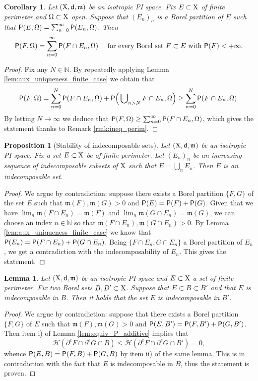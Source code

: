 \documentclass[reqno]{amsart}
\numberwithin{equation}{section}
\newcommand{\N}{\mathbb{N}}
\newcommand{\X}{{\rm X}}
\newcommand{\sfd}{{\sf d}}
\newcommand{\mm}{\mathfrak m}
\newcommand{\1}{\mathbbm 1}
\renewcommand{\P}{{\sf P}}
\renewcommand{\H}{{\mathcal H}}
\newtheorem{corollary}[theorem]{Corollary}
\newtheorem{lemma}[theorem]{Lemma}
\newtheorem{proposition}[theorem]{Proposition}
\begin{document}
%
%
\begin{corollary}\label{cor:aux_uniqueness}
Let \((\X,\sfd,\mm)\) be an isotropic PI space. Fix \(E\subset\X\)
of finite perimeter and \(\Omega\subset\X\) open. Suppose
that \((E_n)_n\) is a Borel partition of \(E\) such that
\(\P(E,\Omega)=\sum_{n=0}^\infty\P(E_n,\Omega)\). Then
\[
\P(F,\Omega)=\sum_{n=0}^\infty\P(F\cap E_n,\Omega)
\quad\text{ for every Borel set }F\subset E\text{ with }\P(F)<+\infty.
\]
\end{corollary}
\begin{proof}
Fix any \(N\in\N\). By repeatedly applying Lemma \ref{lem:aux_uniqueness_finite_case}
we obtain that
\[
\P(F,\Omega)=\sum_{n=0}^N\P(F\cap E_n,\Omega)+
\P\Big(\bigcup\nolimits_{n>N}F\cap E_n,\Omega\Big)\geq\sum_{n=0}^N\P(F\cap E_n,\Omega).
\]
By letting \(N\to\infty\) we deduce that
\(\P(F,\Omega)\geq\sum_{n=0}^\infty\P(F\cap E_n,\Omega)\),
which gives the statement thanks to Remark \ref{rmk:ineq_perim}.
\end{proof}
%
%
\begin{proposition}[Stability of indecomposable sets]\label{prop:stab_union_indec}
Let \((\X,\sfd,\mm)\) be an isotropic PI space. Fix a set \(E\subset\X\) be of finite
perimeter. Let \((E_n)_n\) be an increasing sequence of indecomposable subsets
of \(\X\) such that \(E=\bigcup_n E_n\). Then \(E\) is an indecomposable set.
\end{proposition}
\begin{proof}
We argue by contradiction: suppose there exists a Borel partition \(\{F,G\}\)
of the set \(E\) such that \(\mm(F),\mm(G)>0\) and \(\P(E)=\P(F)+\P(G)\). Given that
we have \(\lim_n\mm(F\cap E_n)=\mm(F)\) and \(\lim_n\mm(G\cap E_n)=\mm(G)\), we can
choose an index \(n\in\N\) so that \(\mm(F\cap E_n),\mm(G\cap E_n)>0\).
By Lemma \ref{lem:aux_uniqueness_finite_case} we know that
\(\P(E_n)=\P(F\cap E_n)+\P(G\cap E_n)\). Being \(\{F\cap E_n,G\cap E_n\}\)
a Borel partition of \(E_n\), we get a contradiction with the indecomposability
of \(E_n\). This gives the statement.
\end{proof}
%
%
\begin{lemma}\label{lem:stab_indec}
Let \((\X,\sfd,\mm)\) be an isotropic PI space and \(E\subset\X\) a set of finite
perimeter. Fix two Borel sets \(B,B'\subset\X\).
Suppose that \(E\subset B\subset B'\) and that \(E\) is indecomposable
in \(B\). Then it holds that the set \(E\) is indecomposable in \(B'\).
\end{lemma}
\begin{proof}
We argue by contradiction: suppose that there exists a Borel partition
\(\{F,G\}\) of \(E\) such that \(\mm(F),\mm(G)>0\) and \(\P(E,B')=\P(F,B')+\P(G,B')\).
Then item i) of Lemma \ref{lem:equiv_P_additive} implies that
\[
\H(\partial^e F\cap\partial^e G\cap B)\leq\H(\partial^e F\cap\partial^e G\cap B')=0,
\]
whence \(\P(E,B)=\P(F,B)+\P(G,B)\) by item ii) of the same lemma.
This is in contradiction with the fact that \(E\) is indecomposable in \(B\),
thus the statement is proven.
\end{proof}
%
%
%
%
\end{document}
